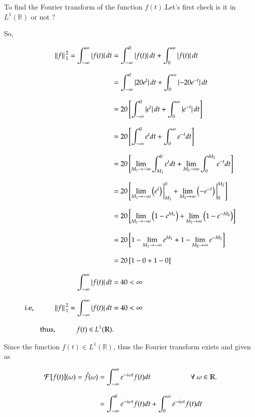 \documentclass[12pt, a4paper]{article} %
\begin{document}
To find the Fourier transform of the function $f(t)$.Let's first check is it in $L^1(\mathbb{R})$ or not ?

So, 

\BgThispage

\begin{equation*}
    \begin{split}
        \norm*{f}_1^2 = \int_{-\infty}^{\infty}\abs*{f(t)}dt & = \int_{-\infty}^{0}\abs*{f(t)}dt + \int_{0}^{\infty}\abs*{f(t)}dt\\[3mm]
        & = \int_{-\infty}^{0}\abs*{20e^t}dt + \int_{0}^{\infty}\abs*{-20e^{-t}}dt\\[3mm]
        & = 20\left[\int_{-\infty}^{0}\abs*{e^t}dt + \int_{0}^{\infty}\abs*{e^{-t}}dt\right]\\[3mm]
        & = 20\left[\int_{-\infty}^{0}e^tdt + \int_{0}^{\infty}e^{-t}dt\right]\\[3mm]
        & = 20\left[\lim_{M_1\to -\infty}\int_{M_1}^{0}e^tdt + \lim_{M_2\to \infty}\int_{0}^{M_2}e^{-t}dt\right]\\[3mm]
        & = 20\left[\lim_{M_1\to -\infty}\left(e^t\right)\bigg|_{M_1}^{0} + \lim_{M_2\to \infty}\left(-e^{-t}\right)\bigg|_{0}^{M_2}\right]\\[3mm]
        & = 20\left[\lim_{M_1\to -\infty}\left(1-e^{M_1}\right)+ \lim_{M_2\to \infty}\left(1-e^{-M_2}\right)\right]\\[3mm]
        & = 20\left[1 - \lim_{M_1\to -\infty}e^{M_1} + 1 - \lim_{M_2\to \infty}e^{-M_2} \right]\\[3mm]
        & = 20\left[1-0+1-0\right]\\[3mm]
        \int_{-\infty}^{\infty}\abs*{f(t)}dt & = 40 < \infty\\[3mm]
        \mbox{i.e}, \hspace*{1cm} \norm*{f}_1^2 = \int_{-\infty}^{\infty}\abs*{f(t)}dt & = 40 < \infty \\[3mm]
        \mbox{thus}, \hspace*{1cm} f(t)\in L^1(\mathbb{R}) &.
    \end{split}
\end{equation*}

Since the function $f(t)\in L^1(\mathbb{R})$, thus the Fourier transform exists and given as

\begin{equation*}
    \begin{split}
        \mathcal{F}[f(t)](\omega) = \hat{f}(\omega) & = \int_{-\infty}^{\infty}e^{-i\omega t} f(t)dt\hspace*{2cm} \forall\ \omega\in \mathbb{R}.\\[3mm]
        & = \int_{-\infty}^{0}e^{-i\omega t} f(t)dt + \int_{0}^{\infty}e^{-i\omega t} f(t)dt\\[3mm]
    \end{split}
\end{equation*}
\end{document}
